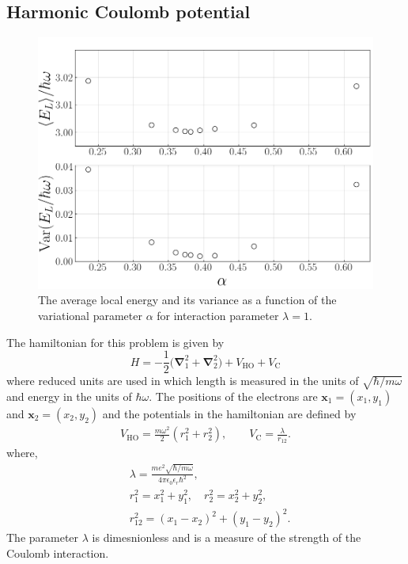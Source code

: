 \documentclass[twocolumn]{article}
\begin{document}
\begin{large}
\subsection*{Harmonic Coulomb potential}
\begin{figure}[!b]
    \includegraphics[scale=0.35]{ParamsEnergylambda1.png}
    \caption{The average local energy and its variance as a function of the variational parameter $\alpha$ for interaction parameter $\lambda=1$.}
    \label{11apr0919}
\end{figure}
The hamiltonian for this problem is given by
\begin{equation}
    H = -\frac{1}{2}\big(\boldsymbol{\nabla}_1^2+\boldsymbol{\nabla}_2^2\big) + V_\text{HO} + V_\text{C}
\end{equation}
where reduced units are used in which length is measured in the units of $\sqrt{\hbar/m\omega}$ and energy in the units of $\hbar\omega$. The positions of the electrons are $\mathbf{x}_1 = (x_1,y_1)$ and $\mathbf{x}_2 = (x_2,y_2)$ and the potentials in the hamiltonian are defined by
\begin{equation}
    \begin{split}
        V_\text{HO} = \frac{m\omega^2}{2}\left(r_1^2+r_2^2\right), \quad\quad V_\text{C}  = \frac{\lambda}{r_{12}}.
    \end{split}
\end{equation}
where,
\begin{equation}
    \begin{split}
        & \lambda = \frac{me^2\sqrt{\hbar/m\omega}}{4\pi\epsilon_0\epsilon_r\hbar^2}, \\ 
        &r_1^2 = x_1^2+y_1^2, \quad r_2^2 = x_2^2+y_2^2, \\ 
        &r_{12}^2 = (x_1-x_2)^2+(y_1-y_2)^2. 
    \end{split}
\end{equation}
The parameter $\lambda$ is dimesnionless and is a measure of the strength of the Coulomb interaction. 


\end{large}
\end{document}
